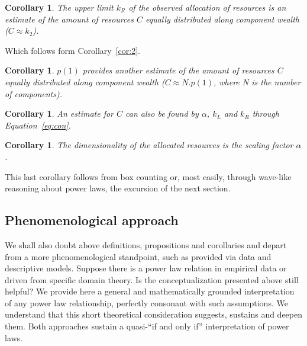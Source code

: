\documentclass[a4paper, 11pt]{article} %
\newtheorem{corollary}[theorem2]{Corollary}
\begin{document}

\begin{corollary}
	The upper limit $k_R$ of the observed allocation of resources is an estimate of the amount of resources $C$ equally distributed along component wealth ($C\approx k_2$).
\end{corollary}

Which follows form Corollary~\ref{cor:2}.

\begin{corollary}
	$p(1)$ provides another estimate of the amount of resources $C$ equally distributed along component wealth ($C\approx N . p(1)$, where N is the number of components).
\end{corollary}

\begin{corollary}
	An estimate for $C$ can also be found by $\alpha$, $k_L$ and $k_R$ through Equation~\ref{eq:con}.
\end{corollary}

\begin{corollary}
	The dimensionality of the allocated resources is the scaling factor $\alpha$.
\end{corollary}

This last corollary follows from box counting or, most easily,
through wave-like reasoning about power laws,
the excursion of the next section.

\subsection{Phenomenological approach}\label{sec:phen}

We shall also
doubt above definitions, propositions and corollaries 
and depart from a more phenomenological standpoint,
such as provided via data and descriptive models.
Suppose there is a power law relation in empirical data
or driven from specific domain theory.
Is the conceptualization
presented above still helpful?
We provide here a general and mathematically grounded
interpretation of any power law relationship,
perfectly consonant with such assumptions.
We understand that this short theoretical consideration
suggests, sustains and deepen them.
Both approaches sustain a quasi-``if and only if''
interpretation of power laws.
\end{document}
